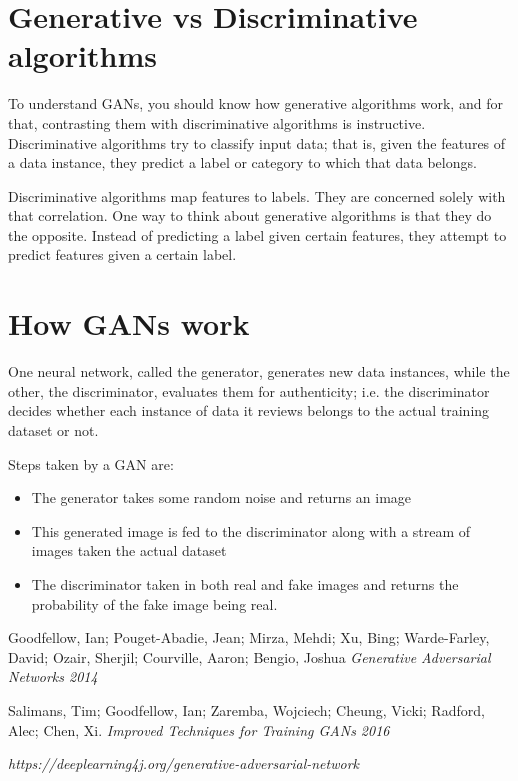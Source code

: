 \documentclass[12pt, a4paper]{report}
\begin{document}
    \section{Generative vs Discriminative algorithms}
    To understand GANs, you should know how generative algorithms work, and for 
    that, contrasting them with discriminative algorithms is instructive. 
    Discriminative algorithms try to classify input data; that is, given the 
    features of a data instance, they predict a label or category to which that 
    data belongs.


    Discriminative algorithms map features to labels. They are concerned solely 
    with that correlation. One way to think about generative algorithms is that 
    they do the opposite. Instead of predicting a label given certain features, 
    they attempt to predict features given a certain label.

    \section{How GANs work}

    One neural network, called the generator, generates new data instances, while 
    the other, the discriminator, evaluates them for authenticity; i.e. the 
    discriminator decides whether each instance of data it reviews belongs to the 
    actual training dataset or not.\cite{fourj}

    Steps taken by a GAN are:
    \begin{itemize}
    \item{The generator takes some random noise and returns an image}
    \item{This generated image is fed to the discriminator along with a stream of 
    images taken the actual dataset}
    \item{The discriminator taken in both real and fake images and returns the 
    probability of the fake image being real.}
    \end{itemize}

    \newpage
    \begin{thebibliography}{99}
        Goodfellow, Ian; Pouget-Abadie, Jean; Mirza, Mehdi; Xu, Bing; Warde-Farley, 
        David; Ozair, Sherjil; Courville, Aaron; Bengio, Joshua 
        \textit{Generative Adversarial Networks 2014}
    
        Salimans, Tim; Goodfellow, Ian; Zaremba, Wojciech; Cheung, Vicki; 
        Radford, Alec; Chen, Xi. 
        \textit{Improved Techniques for Training GANs 2016}

      \textit{https://deeplearning4j.org/generative-adversarial-network}

\end{thebibliography}
\end{document}
